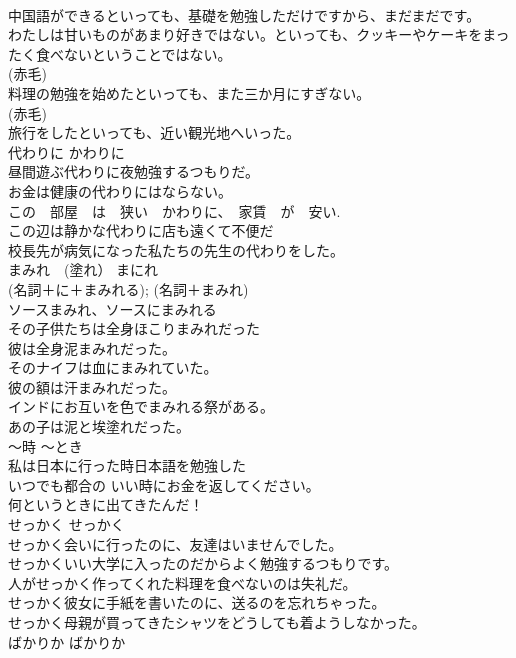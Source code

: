 \documentclass[8pt]{extreport}
\begin{document}
\begin{CJK}{UTF8}{min}
\\	中国語ができるといっても、基礎を勉強しただけですから、まだまだです。  
\\	わたしは甘いものがあまり好きではない。といっても、クッキーやケーキをまったく食べないということではない。  
\\	(赤毛)
\\	料理の勉強を始めたといっても、また三か月にすぎない。  
\\	(赤毛)
\\	旅行をしたといっても、近い観光地へいった。  
\\	代わりに	かわりに	
\\	昼間遊ぶ代わりに夜勉強するつもりだ。  
\\	お金は健康の代わりにはならない。  
\\	この　部屋　は　狭い　かわりに、　家賃　が　安い.   
\\	この辺は静かな代わりに店も遠くて不便だ　   
\\	校長先が病気になった私たちの先生の代わりをした。  
\\	まみれ　(塗れ）	まにれ	
\\	(名詞＋に＋まみれる); (名詞＋まみれ)	
\\	ソースまみれ、ソースにまみれる	
\\	その子供たちは全身ほこりまみれだった   
\\	彼は全身泥まみれだった。   
\\	そのナイフは血にまみれていた。  
\\	彼の額は汗まみれだった。  
\\	インドにお互いを色でまみれる祭がある。  
\\	あの子は泥と埃塗れだった。  
\\	〜時	〜とき	
\\	私は日本に行った時日本語を勉強した  
\\	いつでも都合の いい時にお金を返してください。  
\\	何というときに出てきたんだ！  
\\	せっかく	せっかく	
\\	せっかく会いに行ったのに、友達はいませんでした。  
\\	せっかくいい大学に入ったのだからよく勉強するつもりです。  
\\	人がせっかく作ってくれた料理を食べないのは失礼だ。   
\\	せっかく彼女に手紙を書いたのに、送るのを忘れちゃった。  
\\	せっかく母親が買ってきたシャツをどうしても着ようしなかった。  
\\	ばかりか	ばかりか	

\end{CJK}
\end{document}

